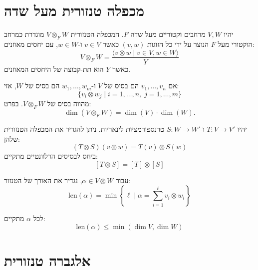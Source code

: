 \documentclass{tstextbook}
\begin{document}
\section{מכפלה טנזורית מעל שדה}

\begin{definition}
יהיו \(V, W\) מרחבים וקטוריים מעל שדה \(F\). המכפלה הטנזורית \(V \otimes_{F} W\) מוגדרת כמרחב הוקטורי מעל \(F\) הנוצר על ידי כל הזוגות \((v, w)\) כאשר \(v \in V\) ו-\(w \in W\), עם יחסים מאוזנים:
$$V \otimes_{F} W = \frac{\langle v \otimes w \mid v \in V, w \in W \rangle}{Y}$$
כאשר \(Y\) הוא תת-קבוצה של היחסים המאוזנים.

\end{definition}
\begin{proposition}
אם \(v_{1}, \dots, v_{n}\) הם בסיס של \(V\) ו-\(w_{1}, \dots, w_{m}\) הם בסיס של \(W\), אזי:
$$\{v_{i} \otimes w_{j} \mid i=1,\dots,n, \; j=1,\dots,m\}$$
מהווה בסיס של \(V \otimes_{F} W\). בפרט:
$$\dim(V \otimes_{F} W) = \dim(V) \cdot \dim(W).$$

\end{proposition}
\begin{definition}
יהיו \(T: V \to V'\) ו-\(S: W \to W'\) טרנספורמציות לינאריות. ניתן להגדיר את המכפלה הטנזורית שלהן:
$$(T \otimes S)(v \otimes w) = T(v) \otimes S(w)$$
ביחס לבסיסים הרלוונטיים מתקיים:
$$[T \otimes S] = [T] \otimes [S]$$

\end{definition}
\begin{definition}
עבור \(\alpha \in V \otimes W\), נגדיר את האורך של הטנזור:
$$\mathrm{len}(\alpha) = \min \left\{ \ell \mid \alpha = \sum_{i=1}^{\ell} v_{i} \otimes w_{i} \right\}$$

\end{definition}
\begin{corollary}
לכל \(\alpha\) מתקיים:
$$\mathrm{len}(\alpha) \leq \min(\dim V, \dim W)$$

\end{corollary}
\section{אלגברה טנזורית}
\end{document}
